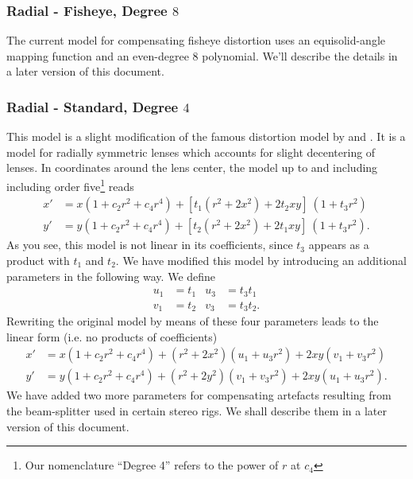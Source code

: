 \documentclass[10pt,a4paper]{article}
\begin{document}
\subsubsection{Radial - Fisheye, Degree $8$}
The current model for compensating fisheye distortion uses an equisolid-angle mapping function
and an even-degree 8 polynomial. We'll describe the details in a later version of this document.

\subsubsection{Radial - Standard, Degree $4$}
This model is a slight modification of the famous
distortion model by \Brown [1966] and \Conradi [1919].
It is a model for radially symmetric lenses which accounts for
slight decentering of lenses. In coordinates around the lens center,
the model up to and including including order five\footnote{Our nomenclature ``Degree 4'' refers to the power of $r$ at $c_4$} reads
\begin{align}
x' &= x (1 + c_2 r^2 + c_4 r^4) + \left[t_1(r^2+2x^2) + 2t_2 xy\right]\ (1 + t_3 r^2)\nonumber\\
y' &= y (1 + c_2 r^2 + c_4 r^4) + \left[t_2(r^2+2x^2) + 2t_1 xy\right]\ (1 + t_3 r^2) .
\end{align}
As you see, this model is not linear in its coefficients, since $t_3$ appears as a product with $t_1$ and $t_2$.
We have modified this model by introducing an additional parameters in the following way. We define
\begin{align}
u_1 &= t_1 & u_3 &= t_3 t_1 \nonumber\\
v_1 &= t_2 & v_3 &= t_3 t_2.
\end{align}
Rewriting the original model by means of these four parameters leads to the linear form
(i.e. no products of coefficients)
\begin{align}
x'	&= x (1 + c_2 r^2 + c_4 r^4)
	+ (r^2 + 2 x^2)	(u_1 + u_3 r^2)
	+ 2 xy		(v_1 + v_3 r^2) \nonumber\\
y'	&= y (1 + c_2 r^2 + c_4 r^4)
	+ (r^2 + 2 y^2)	(v_1 + v_3 r^2)
	+ 2 xy		(u_1 + u_3 r^2).
\end{align}
We have added two more parameters for compensating artefacts resulting
from the beam-splitter used in certain stereo rigs. We shall describe them in a later
version of this document.
\end{document}
